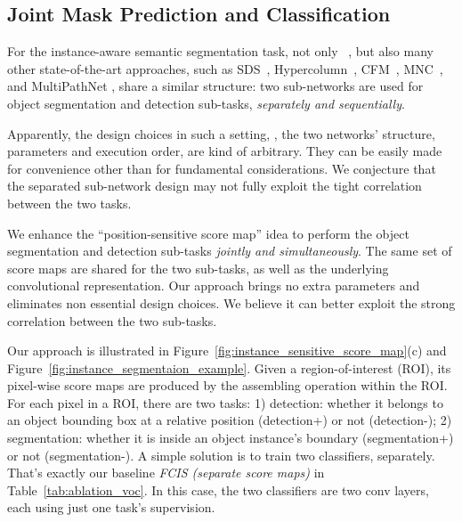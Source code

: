 \documentclass[10pt,twocolumn,letterpaper]{article}
\begin{document}
\subsection{Joint Mask Prediction and Classification}
\label{sec.joint_formulation}
For the instance-aware semantic segmentation task, not only ~\cite{dai2016instance}, but also many other state-of-the-art approaches, such as SDS~\cite{hariharan2014simultaneous}, Hypercolumn~\cite{hariharan2015hyper}, CFM~\cite{dai2015convolutional}, MNC~\cite{dai2016mnc}, and MultiPathNet \cite{zagoruyko2016multipath}, share a similar structure: two sub-networks are used for object segmentation and detection sub-tasks, \emph{separately and sequentially}.

Apparently, the design choices in such a setting, \eg, the two networks' structure, parameters and execution order, are kind of arbitrary. They can be easily made for convenience other than for fundamental considerations. We conjecture that the separated sub-network design may not fully exploit the tight correlation between the two tasks.

We enhance the ``position-sensitive score map'' idea to perform the object segmentation and detection sub-tasks \emph{jointly and simultaneously}. The same set of score maps are shared for the two sub-tasks, as well as the underlying convolutional representation. Our approach brings no extra parameters and eliminates non essential design choices. We believe it can better exploit the strong correlation between the two sub-tasks.

Our approach is illustrated in Figure~\ref{fig:instance_sensitive_score_map}(c) and Figure~\ref{fig:instance_segmentaion_example}. Given a region-of-interest (ROI), its pixel-wise score maps are produced by the assembling operation within the ROI. For each pixel in a ROI, there are two tasks: 1) detection: whether it belongs to an object bounding box at a relative position (detection+) or not (detection-); 2) segmentation: whether it is inside an object instance's boundary (segmentation+) or not (segmentation-). A simple solution is to train two classifiers, separately. That's exactly our baseline \emph{FCIS (separate score maps)} in Table~\ref{tab:ablation_voc}. In this case, the two classifiers are two  conv layers, each using just one task's supervision.
\end{document}
